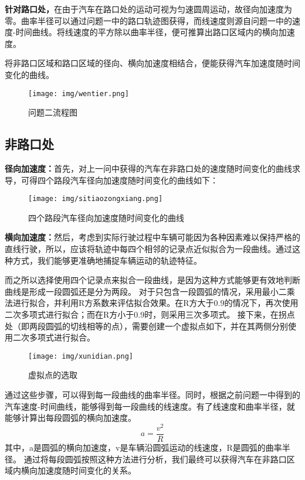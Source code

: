 \documentclass[withoutpreface,bwprint]{cumcmthesis} %
\begin{document}
\textbf{针对路口处，}在由于汽车在路口处的运动可视为匀速圆周运动，故径向加速度为零。曲率半径可以通过问题一中的路口轨迹图获得，而线速度则源自问题一中的速度-时间曲线。将线速度的平方除以曲率半径，便可推算出路口区域内的横向加速度。

将非路口区域和路口区域的径向、横向加速度相结合，便能获得汽车加速度随时间变化的曲线。


\begin{figure}[htbp]
    \centering
    \texttt{[image: img/wentier.png]}
     \captionsetup{font=small, position=below}
    \caption{问题二流程图}
    
\end{figure}

\subsection{非路口处}
\textbf{径向加速度：}首先，对上一问中获得的汽车在非路口处的速度随时间变化的曲线求导，可得四个路段汽车径向加速度随时间变化的曲线如下：
\begin{figure}[htbp]
    \centering
    \texttt{[image: img/sitiaozongxiang.png]}
     \captionsetup{font=small, position=below}
    \caption{四个路段汽车径向加速度随时间变化的曲线}
\end{figure}

\textbf{横向加速度：}然后，考虑到实际行驶过程中车辆可能因为各种因素难以保持严格的直线行驶，所以，应该将轨迹中每四个相邻的记录点近似拟合为一段曲线。通过这种方式，我们能够更准确地捕捉车辆运动的轨迹特征。

而之所以选择使用四个记录点来拟合一段曲线，是因为这种方式能够更有效地判断曲线是形成一段圆弧还是分为两段。
对于只包含一段圆弧的情况，采用最小二乘法进行拟合，并利用R方系数来评估拟合效果。在R方大于0.9的情况下，再次使用二次多项式进行拟合；而在R方小于0.9时，则采用三次多项式。
接下来，在拐点处（即两段圆弧的切线相等的点），需要创建一个虚拟点如下，并在其两侧分别使用二次多项式进行拟合。

\begin{figure}[htbp]
    \centering
    \texttt{[image: img/xunidian.png]}
    \caption{虚拟点的选取}
\end{figure}

通过这些步骤，可以得到每一段曲线的曲率半径。同时，根据之前问题一中得到的汽车速度-时间曲线，能够得到每一段曲线的线速度。有了线速度和曲率半径，就能够计算出每段圆弧的横向加速度。
\begin{equation}
    a=\frac{v^2}{R}
\end{equation}
其中，a是圆弧的横向加速度，v是车辆沿圆弧运动的线速度，R是圆弧的曲率半径。
通过将每段圆弧按照这种方法进行分析，我们最终可以获得汽车在非路口区域内横向加速度随时间变化的关系。
\end{document}
